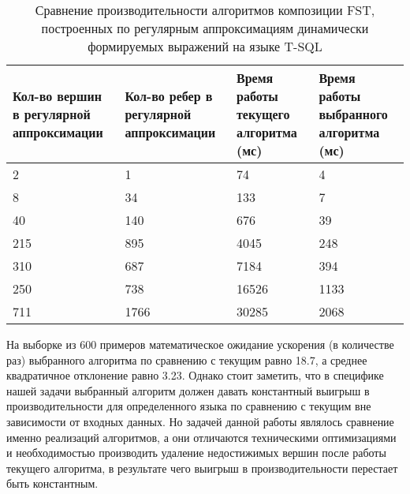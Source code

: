\begin{table}[h]
  \centering
    \begin{tabular}{ p{2.5cm} | p{2.3cm} | p{2.4cm} | p{2.4cm}  }
  Кол-во вершин в регулярной аппроксимации &
  Кол-во ребер в регулярной аппроксимации & 
  Время работы текущего алгоритма (мс) & 
  Время работы выбранного алгоритма (мс) \\ \hline
  2 & 1 & 74 & 4 \\ \hline
  8 & 34 & 133 & 7 \\ \hline
  40 & 140 & 676 & 39 \\ \hline
  215 & 895 & 4045 & 248 \\ \hline
  310 & 687 & 7184 & 394 \\ \hline
  250 & 738 & 16526 & 1133 \\ \hline
  711 & 1766 & 30285 & 2068 \\ 
  \end{tabular}
  \caption{Сравнение производительности алгоритмов композиции FST, построенных по регулярным аппроксимациям динамически формируемых выражений на языке T-SQL}
  \label{table}
\end{table}

На выборке из 600 примеров математическое ожидание ускорения (в количестве раз) выбранного алгоритма по сравнению с текущим равно 18.7, а среднее квадратичное отклонение равно 3.23. Однако стоит заметить, что в специфике нашей задачи выбранный алгоритм должен давать константный выигрыш в производительности для определенного языка по сравнению с текущим вне зависимости от входных данных. Но задачей данной работы являлось сравнение именно реализаций алгоритмов, а они отличаются техническими оптимизациями и необходимостью производить удаление недостижимых вершин после работы текущего алгоритма, в результате чего выигрыш в производительности перестает быть константным.

